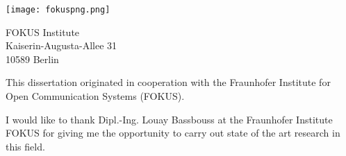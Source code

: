 \thispagestyle{empty}
\vspace*{3cm}


\begin{center}
\texttt{[image: fokuspng.png]}
\end{center}

\vspace*{0.2cm}

\begin{center}
FOKUS Institute\\
Kaiserin-Augusta-Allee 31\\
10589 Berlin\\
\end{center}
\vspace*{0.5cm}

\noindent This dissertation originated in cooperation with the Fraunhofer Institute for Open Communication
Systems (FOKUS).

\vspace*{1cm}
\noindent
I would like to thank Dipl.-Ing. Louay Bassbouss at the Fraunhofer Institute FOKUS for giving me the opportunity
to carry out state of the art research in this field.
